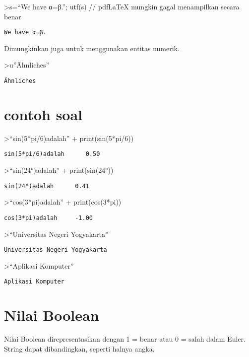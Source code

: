 \documentclass[
]{book}
\begin{document}
\textgreater s=``We have α=β.''; utf(s) // pdfLaTeX mungkin gagal menampilkan secara benar

\begin{verbatim}
We have α=β.
\end{verbatim}

Dimungkinkan juga untuk menggunakan entitas numerik.

\textgreater u''Ähnliches''

\begin{verbatim}
Ähnliches
\end{verbatim}

\section{contoh soal}\label{contoh-soal-2}

\textgreater{}``sin(5*pi/6)adalah'' + print(sin(5*pi/6))

\begin{verbatim}
sin(5*pi/6)adalah      0.50
\end{verbatim}

\textgreater{}``sin(24°)adalah'' + print(sin(24°))

\begin{verbatim}
sin(24°)adalah      0.41
\end{verbatim}

\textgreater{}``cos(3*pi)adalah'' + print(cos(3*pi))

\begin{verbatim}
cos(3*pi)adalah     -1.00
\end{verbatim}

\textgreater{}``Universitas Negeri Yogyakarta''

\begin{verbatim}
Universitas Negeri Yogyakarta
\end{verbatim}

\textgreater{}``Aplikasi Komputer''

\begin{verbatim}
Aplikasi Komputer
\end{verbatim}

\section{Nilai Boolean}\label{nilai-boolean}

Nilai Boolean direpresentasikan dengan 1 = benar atau 0 = salah dalam Euler. String dapat dibandingkan, seperti halnya angka.
\end{document}
